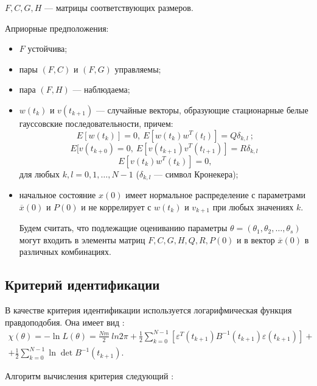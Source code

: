 \documentclass[a4paper,14pt]{extarticle}
\renewcommand{\vec}[1]{#1}
\newcommand{\eps}{\varepsilon}
\begin{document}
$F, C, G, H$ --- матрицы соответствующих размеров.

\bigskip
Априорные предположения:
\begin{itemize}
\item $F$ устойчива;
\item пары $(F, C)$ и $(F, G)$ управляемы;
\item пара $(F, H)$ --- наблюдаема;
\item $\vec{w}(t_k)$ и $\vec{v}(t_{k+1})$ --- случайные векторы, образующие
стационарные белые гауссовские последовательности, причем:
\[
E[\vec{w}(t_k)] = 0,\ E[\vec{w}(t_k)\vec{w}^{T}(t_l)] = Q \delta_{k,l}\ ;
\]
\[
E[\vec{v}(t_{k+0}) = 0,\ E[\vec{v}(t_{k+1})\vec{v}^{T}(t_{l+1})] = R
\delta_{k,l}\;
\]
\[
E[\vec{v}(t_k)\vec{w}^{T}(t_k)] = 0,
\]
для любых $k, l = 0, 1, \ldots, N-1$ ($\delta_{k,l}$ --- символ Кронекера);

\item начальное состояние $\vec{x}(0)$ имеет нормальное распределение с
параметрами $\overline{\vec{x}}(0)$ и $P(0)$ и не коррелирует с $\vec{w(t_k)}$
и $\vec{v_{k+1}}$ при любых значениях $k$.

Будем считать, что подлежащие оцениванию параметры $\theta = (\theta_1,
\theta_2, \ldots, \theta_s)$ могут входить в элементы матриц $F, C, G, H, Q, R,
P(0)$ и в вектор $\overline{\vec{x}}(0)$ в различных комбинациях.

\end{itemize}

\subsection{Критерий идентификации}


В качестве критерия идентификации используется логарифмическая функция
правдоподобия. Она имеет вид \cite{mono}:
\begin{equation*}
\begin{split}
  \chi(\theta) = -\ln{L(\theta)} = \frac{Nm}{2}\ ln{2\pi} + \frac{1}{2}
  \sum\limits_{k=0}^{N-1} \left[ \eps^T(t_{k+1}) B^{-1}(t_{k+1}) \eps(t_{k+1}) \right]
  + \\ + \frac{1}{2} \sum\limits_{k=0}^{N-1} \ln \det B^{-1}(t_{k+1}).
\end{split}
\end{equation*}

Алгоритм вычисления критерия следующий \cite{mono}:
\end{document}
